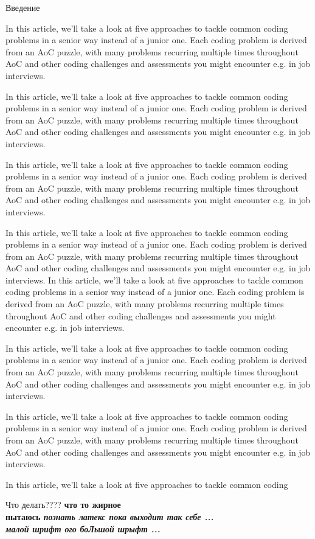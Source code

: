 \documentclass[oneside,final,12pt]{extreport}
\begin{document}
\begin{chapter} {Введение}

In this article, we’ll take a look at five approaches to tackle common coding problems in a senior way instead of a junior one. Each coding problem is derived from an AoC puzzle, with many problems recurring multiple times throughout AoC and other coding challenges and assessments you might encounter e.g. in job interviews.

In this article, we’ll take a look at five approaches to tackle common coding problems in a senior way instead of a junior one. Each coding problem is derived from an AoC puzzle, with many problems recurring multiple times throughout AoC and other coding challenges and assessments you might encounter e.g. in job interviews.

In this article, we’ll take a look at five approaches to tackle common coding problems in a senior way instead of a junior one. Each coding problem is derived from an AoC puzzle, with many problems recurring multiple times throughout AoC and other coding challenges and assessments you might encounter e.g. in job interviews.

In this article, we’ll take a look at five approaches to tackle common coding problems in a senior way instead of a junior one. Each coding problem is derived from an AoC puzzle, with many problems recurring multiple times throughout AoC and other coding challenges and assessments you might encounter e.g. in job interviews.
In this article, we’ll take a look at five approaches to tackle common coding problems in a senior way instead of a junior one. Each coding problem is derived from an AoC puzzle, with many problems recurring multiple times throughout AoC and other coding challenges and assessments you might encounter e.g. in job interviews.

In this article, we’ll take a look at five approaches to tackle common coding problems in a senior way instead of a junior one. Each coding problem is derived from an AoC puzzle, with many problems recurring multiple times throughout AoC and other coding challenges and assessments you might encounter e.g. in job interviews.

In this article, we’ll take a look at five approaches to tackle common coding problems in a senior way instead of a junior one. Each coding problem is derived from an AoC puzzle, with many problems recurring multiple times throughout AoC and other coding challenges and assessments you might encounter e.g. in job interviews.

In this article, we’ll take a look at five approaches to tackle common coding  


Что делать???? \bf что то жирное \\
пытаюсь \it {познать латекс} \normalfont пока выходит так себе ... \\
{\tiny малой шрифт } \Huge ого боЛьшой шрыфт ... \\

\end{chapter}
	
\end{document}
